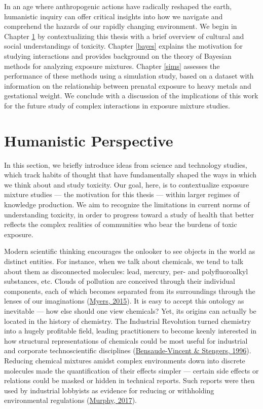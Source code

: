 \documentclass[12pt, twoside]{amherstthesis}
\begin{document}
In an age where anthropogenic actions have radically reshaped the earth, humanistic inquiry can offer critical insights into how we navigate and comprehend the hazards of our rapidly changing environment. We begin in Chapter \ref{humanistic} by contextualizing this thesis with a brief overview of cultural and social understandings of toxicity. Chapter \ref{bayes} explains the motivation for studying interactions and provides background on the theory of Bayesian methods for analyzing exposure mixtures. Chapter \ref{sims} assesses the performance of these methods using a simulation study, based on a dataset with information on the relationship between prenatal exposure to heavy metals and gestational weight. We conclude with a discussion of the implications of this work for the future study of complex interactions in exposure mixture studies.

\hypertarget{humanistic}{%
\chapter{Humanistic Perspective}\label{humanistic}}

In this section, we briefly introduce ideas from science and technology studies, which track habits of thought that have fundamentally shaped the ways in which we think about and study toxicity. Our goal, here, is to contextualize exposure mixture studies --- the motivation for this thesis --- within larger regimes of knowledge production. We aim to recognize the limitations in current norms of understanding toxicity, in order to progress toward a study of health that better reflects the complex realities of communities who bear the burdens of toxic exposure.

Modern scientific thinking encourages the onlooker to see objects in the world as distinct entities. For instance, when we talk about chemicals, we tend to talk about them as disconnected molecules: lead, mercury, per- and polyfluoroalkyl substances, etc. Clouds of pollution are conceived through their individual components, each of which becomes separated from its surroundings through the lenses of our imaginations (\protect\hyperlink{ref-myers_rendering_2015}{Myers, 2015}). It is easy to accept this ontology as inevitable --- how else should one view chemicals? Yet, its origins can actually be located in the history of chemistry. The Industrial Revolution turned chemistry into a hugely profitable field, leading practitioners to become keenly interested in how structural representations of chemicals could be most useful for industrial and corporate technoscientific disciplines (\protect\hyperlink{ref-bensaude-vincent_history_1996}{Bensaude-Vincent \& Stengers, 1996}). Reducing chemical mixtures amidst complex environments down into discrete molecules made the quantification of their effects simpler --- certain side effects or relations could be masked or hidden in technical reports. Such reports were then used by industrial lobbyists as evidence for reducing or withholding environmental regulations (\protect\hyperlink{ref-murphy_alterlife_2017}{Murphy, 2017}).
\end{document}
